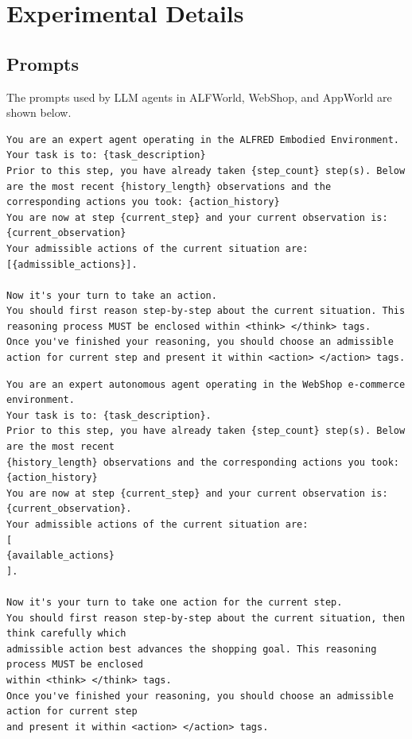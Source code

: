 \documentclass{article}
\begin{document}
\section{Experimental Details}
\label{appendix:exp}

\subsection{Prompts}
The prompts used by LLM agents in ALFWorld, WebShop, and AppWorld are shown below.

\begin{promptbox}[title=Prompt Template for ALFWorld]
\begin{lstlisting}[style=mytt]
You are an expert agent operating in the ALFRED Embodied Environment. Your task is to: {task_description}
Prior to this step, you have already taken {step_count} step(s). Below are the most recent {history_length} observations and the corresponding actions you took: {action_history}
You are now at step {current_step} and your current observation is: {current_observation}
Your admissible actions of the current situation are: [{admissible_actions}].

Now it's your turn to take an action.
You should first reason step-by-step about the current situation. This reasoning process MUST be enclosed within <think> </think> tags. 
Once you've finished your reasoning, you should choose an admissible action for current step and present it within <action> </action> tags.
\end{lstlisting}
\end{promptbox}

\begin{promptbox}[title=Prompt Template for WebShop]
\begin{lstlisting}[style=mytt]
You are an expert autonomous agent operating in the WebShop e-commerce environment.
Your task is to: {task_description}.
Prior to this step, you have already taken {step_count} step(s). Below are the most recent
{history_length} observations and the corresponding actions you took: {action_history}
You are now at step {current_step} and your current observation is: {current_observation}.
Your admissible actions of the current situation are:
[
{available_actions}
].

Now it's your turn to take one action for the current step.
You should first reason step-by-step about the current situation, then think carefully which
admissible action best advances the shopping goal. This reasoning process MUST be enclosed
within <think> </think> tags.
Once you've finished your reasoning, you should choose an admissible action for current step
and present it within <action> </action> tags.
\end{lstlisting}
\end{promptbox}
\end{document}
